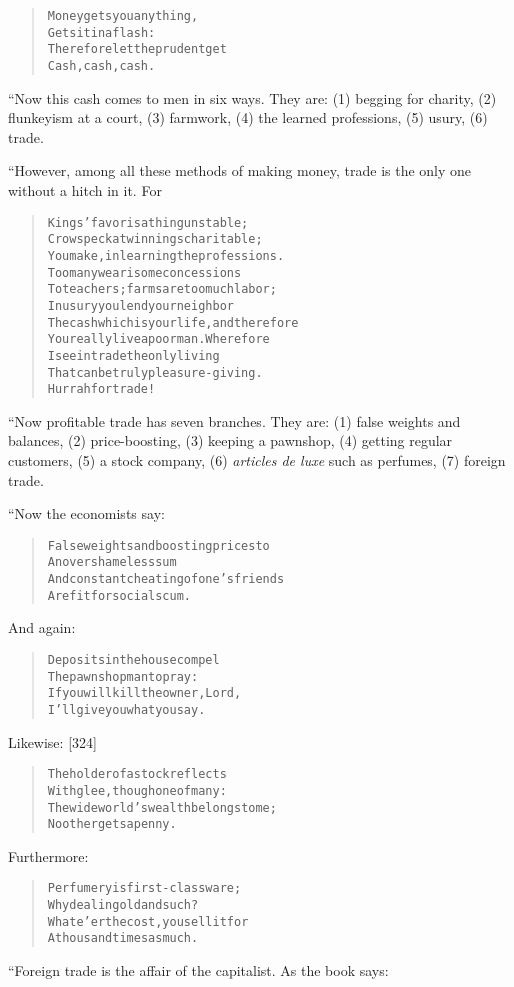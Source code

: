 \documentclass[article, twoside, 14pt]{memoir}
\renewenvironment{verbatim}{%
\begin{quote}%
\vskip -10pt%
\begin{alltt}\normalfont\large}{\end{alltt}%
\end{quote}%
\vskip -10pt
} %
\begin{document}
\begin{verbatim}
Money gets you anything,
    Gets it in a flash:
Therefore let the prudent get
    Cash, cash, cash.
\end{verbatim}
“Now this cash comes to men in six ways. They are: (1) begging for
charity, (2) flunkeyism at a court, (3) farmwork, (4) the learned
professions, (5) usury, (6) trade.

“However, among all these methods of making money, trade is the
only one without a hitch in it. For

\begin{verbatim}
Kings' favor is a thing unstable;
Crows peck at winnings charitable;
You make, in learning the professions.
Too many wearisome concessions
To teachers; farms are too much labor;
In usury you lend your neighbor
The cash which is your life, and therefore
You really live a poor man. Wherefore
I see in trade the only living
That can be truly pleasure-giving.
Hurrah for trade!
\end{verbatim}
“Now profitable trade has seven branches. They are: (1) false
weights and balances, (2) price-boosting, (3) keeping a pawnshop,
(4) getting regular customers, (5) a stock company, (6)
\emph{articles de luxe} such as perfumes, (7) foreign trade.

“Now the economists say:

\begin{verbatim}
False weights and boosting prices to
    An overshameless sum
And constant cheating of one's friends
    Are fit for social scum.
\end{verbatim}
And again:

\begin{verbatim}
Deposits in the house compel
    The pawnshop man to pray:
If you will kill the owner, Lord,
    I'll give you what you say.
\end{verbatim}
Likewise: [324]

\begin{verbatim}
The holder of a stock reflects
    With glee, though one of many:
The wide world's wealth belongs to me;
    No other gets a penny.
\end{verbatim}
Furthermore:

\begin{verbatim}
Perfumery is first-class ware;
    Why deal in gold and such?
Whate'er the cost, you sell it for
    A thousand times as much.
\end{verbatim}
“Foreign trade is the affair of the capitalist. As the book says:
\end{document}
